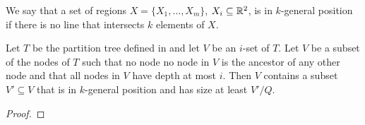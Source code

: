 \documentclass{patmorin}
\begin{document}
We say that a set of regions $X=\{X_1,\ldots,X_m\}$, $X_i\subseteq\mathbb{R}^2$,
is in $k$-general position if there is no line that intersects $k$
elements of $X$.

\begin{lem}
Let $T$ be the partition tree defined in  and let $V$ be an $i$-set of $T$.
Let $V$ be a subset of the nodes of $T$ such that no node no node in $V$
is the ancestor of any other node and that all nodes in $V$ have depth
at most $i$.  Then $V$ contains a subset $V'\subseteq V$ that is in $k$-general position and has size at least $V'/Q$.
\end{lem}

\begin{proof}
\end{proof}




\end{document}
